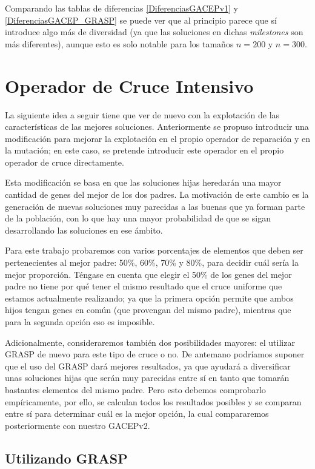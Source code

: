 Comparando las tablas de diferencias \ref{DiferenciasGACEPv1} y \ref{DiferenciasGACEP_GRASP} se puede ver que al principio parece que sí introduce algo más de diversidad (ya que las soluciones en dichas \textit{milestones} son más diferentes), aunque esto es solo notable para los tamaños $n=200$ y $n=300$. 

\section{Operador de Cruce Intensivo}

La siguiente idea a seguir tiene que ver de nuevo con la explotación de las características de las mejores soluciones. 
Anteriormente se propuso introducir una modificación para mejorar la explotación en el propio operador de reparación y en la mutación; en este caso, se pretende introducir este operador en el propio operador de cruce directamente. 

Esta modificación se basa en que las soluciones hijas heredarán una mayor cantidad de genes del mejor de los dos padres. 
La motivación de este cambio es la generación de nuevas soluciones muy parecidas a las buenas que ya forman parte de la población, con lo que hay una mayor probabilidad de que se sigan desarrollando las soluciones en ese ámbito. 

Para este trabajo probaremos con varios porcentajes de elementos que deben ser pertenecientes al mejor padre: 50\%, 60\%, 70\% y 80\%, para decidir cuál sería la mejor proporción. 
Téngase en cuenta que elegir el 50\% de los genes del mejor padre no tiene por qué tener el mismo resultado que el cruce uniforme que estamos actualmente realizando; ya que la primera opción permite que ambos hijos tengan genes en común (que provengan del mismo padre), mientras que para la segunda opción eso es imposible. 

Adicionalmente, consideraremos también dos posibilidades mayores: el utilizar GRASP de nuevo para este tipo de cruce o no. 
De antemano podríamos suponer que el uso del GRASP dará mejores resultados, ya que ayudará a diversificar unas soluciones hijas que serán muy parecidas entre sí en tanto que tomarán bastantes elementos del mismo padre. 
Pero esto debemos comprobarlo empíricamente, por ello, se calculan todos los resultados posibles y se comparan entre sí para determinar cuál es la mejor opción, la cual compararemos posteriormente con nuestro GACEPv2. 

\subsection{Utilizando GRASP}

